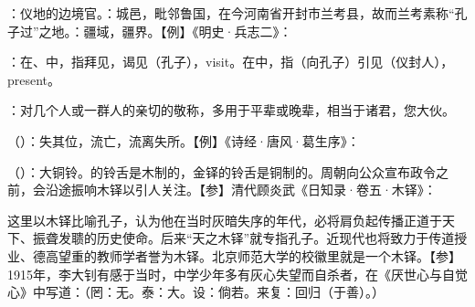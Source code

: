 {
\item {}：仪地的边境官。：城邑，毗邻鲁国，在今河南省开封市兰考县，故而兰考素称“孔子过”之地。：疆域，疆界。【例】《明史·兵志二》：
\item {}：在、中，指拜见，谒见（孔子），visit。在中，指（向孔子）引见（仪封人），present。
\item {}：对几个人或一群人的亲切的敬称，多用于平辈或晚辈，相当于诸君，您大伙。
\item {}（）：失其位，流亡，流离失所。【例】《诗经·唐风·葛生序》：
\item {}（）：大铜铃。的铃舌是木制的，金铎的铃舌是铜制的。周朝向公众宣布政令之前，会沿途振响木铎以引人关注。【参】清代顾炎武《日知录·卷五·木铎》：

这里以木铎比喻孔子，认为他在当时灰暗失序的年代，必将肩负起传播正道于天下、振聋发聩的历史使命。后来“天之木铎”就专指孔子。近现代也将致力于传道授业、德高望重的教师学者誉为木铎。北京师范大学的校徽里就是一个木铎。【参】1915年，李大钊有感于当时，中学少年多有灰心失望而自杀者，在《厌世心与自觉心》中写道：（罔：无。泰：大。设：倘若。来复：回归（于善）。）
}
{}


